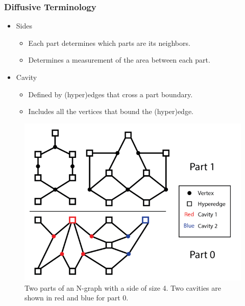 \documentclass{beamer}
\begin{document}
\begin{frame}
  \frametitle{Diffusive Terminology}
  \begin{minipage}{0.45\textwidth}
  \begin{itemize}
  \item Sides
    \begin{itemize}
    \item Each part determines which parts are its neighbors.
    \item Determines a measurement of the area between each part.
    \end{itemize}
  \item Cavity
    \begin{itemize}
    \item Defined by (hyper)edges that cross a part boundary.
    \item Includes all the vertices that bound the (hyper)edge.
    \end{itemize}
  \end{itemize}
  \end{minipage} \hfill
  \begin{minipage}{0.5\textwidth}
  \begin{figure}
    \centering
    \includegraphics[width=\textwidth]{figures/PartBoundary.png}
    \caption{Two parts of an N-graph with a side of size 4. Two cavities are shown in red and blue for part 0.}
  \end{figure}
  \end{minipage}
\end{frame}
\end{document}

